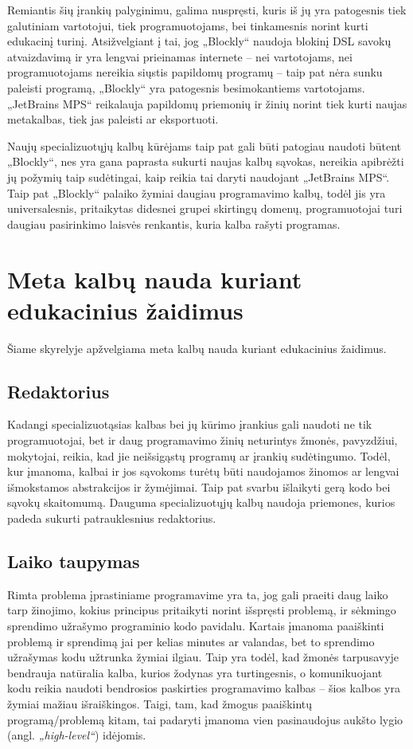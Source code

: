 \documentclass{VUMIFPSkursinis}
\begin{document}
\begin{table}[h]
\begin{tabular}{|l|c|c|}
\end{tabular}
\end{table}

Remiantis šių įrankių palyginimu, galima nuspręsti, kuris iš jų yra patogesnis tiek galutiniam vartotojui, tiek programuotojams, bei tinkamesnis norint kurti edukacinį turinį. Atsižvelgiant į tai, jog „Blockly“ naudoja blokinį DSL savokų atvaizdavimą ir yra lengvai prieinamas internete --  nei vartotojams, nei programuotojams nereikia siųstis papildomų programų -- taip pat nėra sunku paleisti programą, „Blockly“ yra patogesnis besimokantiems vartotojams. „JetBrains MPS“ reikalauja papildomų priemonių ir žinių norint tiek kurti naujas metakalbas, tiek jas paleisti ar eksportuoti.

Naujų specializuotųjų kalbų kūrėjams taip pat gali būti patogiau naudoti būtent „Blockly“, nes yra gana paprasta sukurti naujas kalbų sąvokas, nereikia apibrėžti jų požymių taip sudėtingai, kaip reikia tai daryti naudojant „JetBrains MPS“. Taip pat „Blockly“ palaiko žymiai daugiau programavimo kalbų, todėl jis yra universalesnis, pritaikytas didesnei grupei skirtingų domenų, programuotojai turi daugiau pasirinkimo laisvės renkantis, kuria kalba rašyti programas.

\section{Meta kalbų nauda kuriant edukacinius žaidimus}

Šiame skyrelyje apžvelgiama meta kalbų nauda kuriant edukacinius žaidimus.
\subsection{Redaktorius}
Kadangi specializuotąsias kalbas bei jų kūrimo įrankius gali naudoti ne tik programuotojai, bet ir daug programavimo žinių neturintys žmonės, pavyzdžiui, mokytojai, reikia, kad jie neišsigąstų programų ar įrankių sudėtingumo. Todėl, kur įmanoma, kalbai ir jos sąvokoms turėtų būti naudojamos žinomos ar lengvai išmokstamos abstrakcijos ir žymėjimai. Taip pat svarbu išlaikyti gerą kodo bei sąvokų skaitomumą. Dauguma specializuotųjų kalbų naudoja priemones, kurios padeda sukurti patrauklesnius redaktorius.

\subsection{Laiko taupymas}

Rimta problema įprastiniame programavime yra ta, jog gali praeiti daug laiko tarp žinojimo, kokius principus pritaikyti norint išspręsti problemą, ir sėkmingo sprendimo užrašymo programinio kodo pavidalu. Kartais įmanoma paaiškinti problemą ir sprendimą jai per kelias minutes ar valandas, bet to sprendimo užrašymas kodu užtrunka žymiai ilgiau. Taip yra todėl, kad žmonės tarpusavyje bendrauja natūralia kalba, kurios žodynas yra turtingesnis, o komunikuojant kodu reikia naudoti bendrosios paskirties programavimo kalbas -- šios kalbos yra žymiai mažiau išraiškingos. Taigi, tam, kad žmogus paaiškintų programą/problemą kitam, tai padaryti įmanoma vien pasinaudojus aukšto lygio (angl. \textit{„high-level“}) idėjomis.
\end{document}
